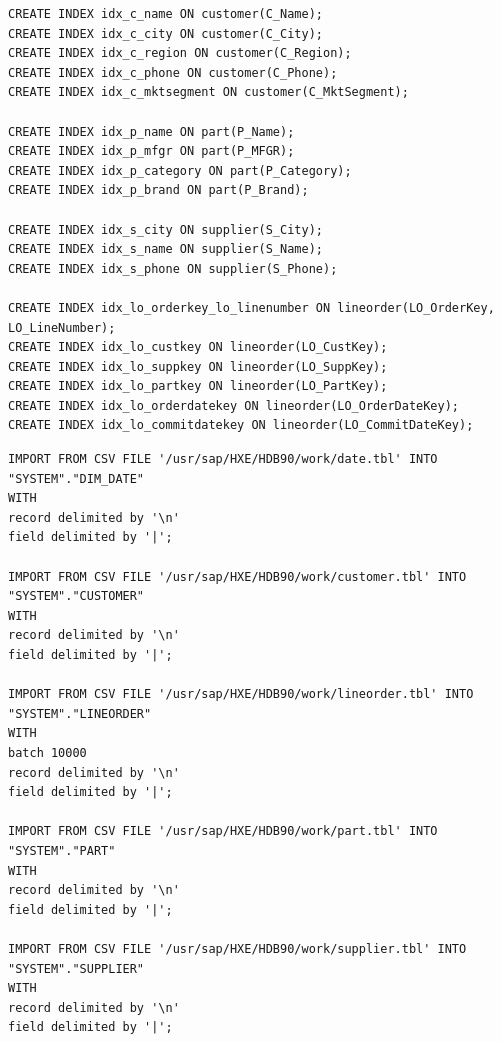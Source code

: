\begin{lstlisting}[label=indizes, caption={Indizes hinzufügen}]
CREATE INDEX idx_c_name ON customer(C_Name);
CREATE INDEX idx_c_city ON customer(C_City);
CREATE INDEX idx_c_region ON customer(C_Region);
CREATE INDEX idx_c_phone ON customer(C_Phone);
CREATE INDEX idx_c_mktsegment ON customer(C_MktSegment);

CREATE INDEX idx_p_name ON part(P_Name);
CREATE INDEX idx_p_mfgr ON part(P_MFGR);
CREATE INDEX idx_p_category ON part(P_Category);
CREATE INDEX idx_p_brand ON part(P_Brand);

CREATE INDEX idx_s_city ON supplier(S_City);
CREATE INDEX idx_s_name ON supplier(S_Name);
CREATE INDEX idx_s_phone ON supplier(S_Phone);

CREATE INDEX idx_lo_orderkey_lo_linenumber ON lineorder(LO_OrderKey, LO_LineNumber);
CREATE INDEX idx_lo_custkey ON lineorder(LO_CustKey);
CREATE INDEX idx_lo_suppkey ON lineorder(LO_SuppKey);
CREATE INDEX idx_lo_partkey ON lineorder(LO_PartKey);
CREATE INDEX idx_lo_orderdatekey ON lineorder(LO_OrderDateKey);
CREATE INDEX idx_lo_commitdatekey ON lineorder(LO_CommitDateKey);
\end{lstlisting}




\begin{lstlisting}[label=importSQL, caption={import.sql}]
IMPORT FROM CSV FILE '/usr/sap/HXE/HDB90/work/date.tbl' INTO "SYSTEM"."DIM_DATE" 
WITH
record delimited by '\n' 
field delimited by '|';

IMPORT FROM CSV FILE '/usr/sap/HXE/HDB90/work/customer.tbl' INTO "SYSTEM"."CUSTOMER" 
WITH
record delimited by '\n' 
field delimited by '|';

IMPORT FROM CSV FILE '/usr/sap/HXE/HDB90/work/lineorder.tbl' INTO "SYSTEM"."LINEORDER" 
WITH
batch 10000
record delimited by '\n' 
field delimited by '|';

IMPORT FROM CSV FILE '/usr/sap/HXE/HDB90/work/part.tbl' INTO "SYSTEM"."PART" 
WITH
record delimited by '\n' 
field delimited by '|';

IMPORT FROM CSV FILE '/usr/sap/HXE/HDB90/work/supplier.tbl' INTO "SYSTEM"."SUPPLIER" 
WITH
record delimited by '\n' 
field delimited by '|';
\end{lstlisting}


